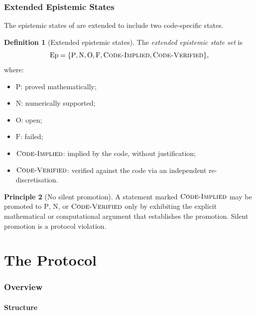 \documentclass[11pt,a4paper]{article}
\theoremstyle{definition}
\newtheorem{definition}{Definition}[section]
\newtheorem{principle}[definition]{Principle}
\theoremstyle{plain}
\newcommand{\Pmark}{\mathrm{P}}
\newcommand{\Nmark}{\mathrm{N}}
\newcommand{\Omark}{\mathrm{O}}
\newcommand{\Fmark}{\mathrm{F}}
\newcommand{\STIMPLIED}{\textsc{Code-Implied}}
\newcommand{\STVERIFIED}{\textsc{Code-Verified}}
\begin{document}
\section{Extended Epistemic States}
\label{sec:epistemic}

The epistemic states of \cite{framework} are extended to include
two code-specific states.

\begin{definition}[Extended epistemic states]\label{def:epistemic-states}
The \emph{extended epistemic state set} is
\[
  \mathrm{Ep} = \{\Pmark, \Nmark, \Omark, \Fmark,
                  \STIMPLIED, \STVERIFIED\},
\]
where:
\begin{itemize}
  \item $\Pmark$: proved mathematically;
  \item $\Nmark$: numerically supported;
  \item $\Omark$: open;
  \item $\Fmark$: failed;
  \item $\STIMPLIED$: implied by the code, without justification;
  \item $\STVERIFIED$: verified against the code via an independent
        re-discretisation.
\end{itemize}
\end{definition}

\begin{principle}[No silent promotion]\label{pr:no-silent}
A statement marked $\STIMPLIED$ may be promoted to $\Pmark$,
$\Nmark$, or $\STVERIFIED$ only by exhibiting the explicit
mathematical or computational argument that establishes the
promotion. Silent promotion is a protocol violation.
\end{principle}

\part{The Protocol}
\label{part:protocol}

\section{Overview}
\label{sec:protocol-overview}

\subsection{Structure}
\end{document}
